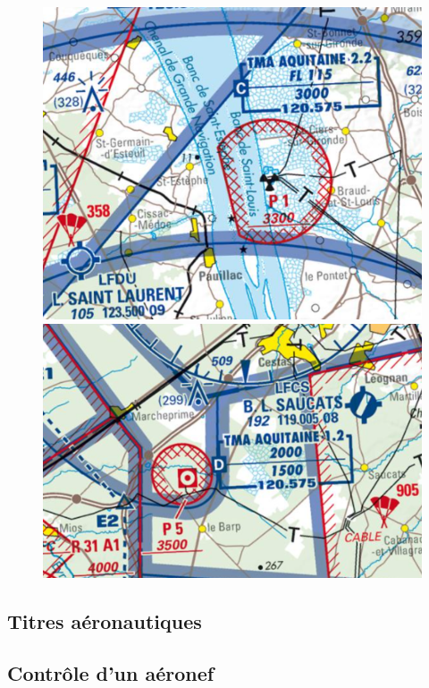 	\begin{figure}[H]
	\begin{minipage}[c]{0.5\linewidth}
	\includegraphics[width=\linewidth]{02-Navigation/img/IGN_OACI_P1.png}
	\end{minipage}
	\hfill
	\begin{minipage}[c]{0.5\linewidth}
	\includegraphics[width=\linewidth]{02-Navigation/img/IGN_OACI_P5.png}
	\end{minipage}
	\end{figure}
	
	\subsection{Titres aéronautiques}
	
	\subsection{Contrôle d'un aéronef}